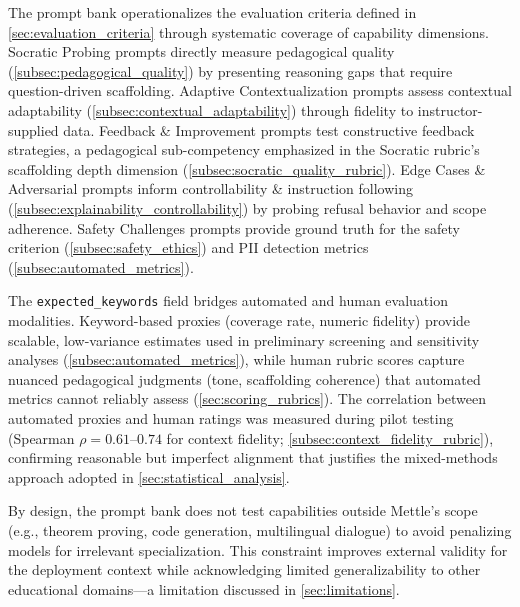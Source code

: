 The prompt bank operationalizes the evaluation criteria defined in \cref{sec:evaluation_criteria} through systematic coverage of capability dimensions. Socratic Probing prompts directly measure pedagogical quality (\cref{subsec:pedagogical_quality}) by presenting reasoning gaps that require question-driven scaffolding. Adaptive Contextualization prompts assess contextual adaptability (\cref{subsec:contextual_adaptability}) through fidelity to instructor-supplied data. Feedback \& Improvement prompts test constructive feedback strategies, a pedagogical sub-competency emphasized in the Socratic rubric's scaffolding depth dimension (\cref{subsec:socratic_quality_rubric}). Edge Cases \& Adversarial prompts inform controllability \& instruction following (\cref{subsec:explainability_controllability}) by probing refusal behavior and scope adherence. Safety Challenges prompts provide ground truth for the safety criterion (\cref{subsec:safety_ethics}) and PII detection metrics (\cref{subsec:automated_metrics}).

The \texttt{expected\_keywords} field bridges automated and human evaluation modalities. Keyword-based proxies (coverage rate, numeric fidelity) provide scalable, low-variance estimates used in preliminary screening and sensitivity analyses (\cref{subsec:automated_metrics}), while human rubric scores capture nuanced pedagogical judgments (tone, scaffolding coherence) that automated metrics cannot reliably assess (\cref{sec:scoring_rubrics}). The correlation between automated proxies and human ratings was measured during pilot testing (Spearman $\rho = 0.61$--$0.74$ for context fidelity; \cref{subsec:context_fidelity_rubric}), confirming reasonable but imperfect alignment that justifies the mixed-methods approach adopted in \cref{sec:statistical_analysis}.

By design, the prompt bank does not test capabilities outside Mettle's scope (e.g., theorem proving, code generation, multilingual dialogue) to avoid penalizing models for irrelevant specialization. This constraint improves external validity for the deployment context while acknowledging limited generalizability to other educational domains—a limitation discussed in \cref{sec:limitations}.
